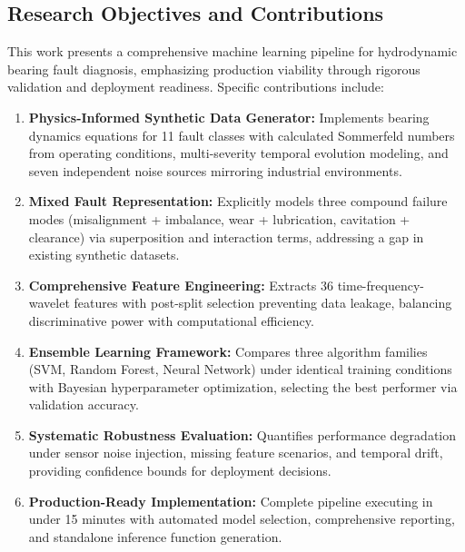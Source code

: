 \documentclass[11pt,a4paper]{article}
\begin{document}
\subsection{Research Objectives and Contributions}

This work presents a comprehensive machine learning pipeline for hydrodynamic bearing fault diagnosis, emphasizing production viability through rigorous validation and deployment readiness. Specific contributions include:

\begin{enumerate}[leftmargin=*, itemsep=0.3em]
    \item \textbf{Physics-Informed Synthetic Data Generator:} Implements bearing dynamics equations for 11 fault classes with calculated Sommerfeld numbers from operating conditions, multi-severity temporal evolution modeling, and seven independent noise sources mirroring industrial environments.
    
    \item \textbf{Mixed Fault Representation:} Explicitly models three compound failure modes (misalignment + imbalance, wear + lubrication, cavitation + clearance) via superposition and interaction terms, addressing a gap in existing synthetic datasets.
    
    \item \textbf{Comprehensive Feature Engineering:} Extracts 36 time-frequency-wavelet features with post-split selection preventing data leakage, balancing discriminative power with computational efficiency.
    
    \item \textbf{Ensemble Learning Framework:} Compares three algorithm families (SVM, Random Forest, Neural Network) under identical training conditions with Bayesian hyperparameter optimization, selecting the best performer via validation accuracy.
    
    \item \textbf{Systematic Robustness Evaluation:} Quantifies performance degradation under sensor noise injection, missing feature scenarios, and temporal drift, providing confidence bounds for deployment decisions.
    
    \item \textbf{Production-Ready Implementation:} Complete pipeline executing in under 15 minutes with automated model selection, comprehensive reporting, and standalone inference function generation.
\end{enumerate}
\end{document}
